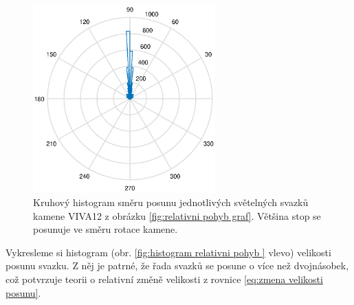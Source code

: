 \begin{figure}[h!]
\begin{center}
\includegraphics[width = 7cm]{figures/kruhovy_histogram.eps}
\end{center}
\caption{Kruhový histogram směru posunu jednotlivých světelných svazků kamene VIVA12 z obrázku \ref{fig:relativni pohyb graf}. Většina stop se posunuje ve směru rotace kamene.}
\label{fig:kruhovy histogram}
\end{figure}

Vykresleme si histogram (obr. \ref{fig:histogram relativni pohyb } vlevo) velikosti posunu svazku. Z něj je patrné, že řada svazků se posune o více než dvojnásobek, což potvrzuje teorii o relativní změně velikosti z rovnice \ref{eq:zmena velikosti posunu}. 


